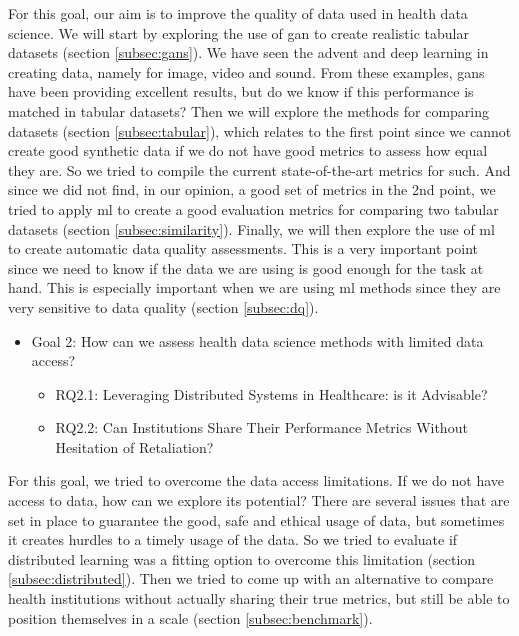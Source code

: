For this goal, our aim is to improve the quality of data used in health data science. We will start by exploring the use of \ac{gan} to create realistic tabular datasets (section \ref{subsec:gans}). We have seen the advent and deep learning in creating data, namely for image, video and sound. From these examples, \acp{gan} have been providing excellent results, but do we know if this performance is matched in tabular datasets? Then we will explore the methods for comparing datasets (section \ref{subsec:tabular}), which relates to the first point since we cannot create good synthetic data if we do not have good metrics to assess how equal they are. So we tried to compile the current state-of-the-art metrics for such. And since we did not find, in our opinion, a good set of metrics in the 2nd point, we tried to apply \ac{ml} to create a good evaluation metrics for comparing two tabular datasets (section \ref{subsec:similarity}). Finally,  we will then explore the use of \ac{ml} to create automatic data quality assessments. This is a very important point since we need to know if the data we are using is good enough for the task at hand. This is especially important when we are using \ac{ml} methods since they are very sensitive to data quality (section \ref{subsec:dq}).

\begin{itemize}

    \item Goal 2: How can we assess health data science methods with limited data access?
    \begin{itemize}
        \item RQ2.1: Leveraging Distributed Systems in Healthcare: is it Advisable?
        \item RQ2.2: Can Institutions Share Their Performance Metrics Without Hesitation of Retaliation?
    \end{itemize}
\end{itemize}

For this goal, we tried to overcome the data access limitations. If we do not have access to data, how can we explore its potential? There are several issues that are set in place to guarantee the good, safe and ethical usage of data, but sometimes it creates hurdles to a timely usage of the data. So we tried to evaluate if distributed learning was a fitting option to overcome this limitation (section \ref{subsec:distributed}). Then we tried to come up with an alternative to compare health institutions without actually sharing their true metrics, but still be able to position themselves in a scale (section \ref{subsec:benchmark}). 

